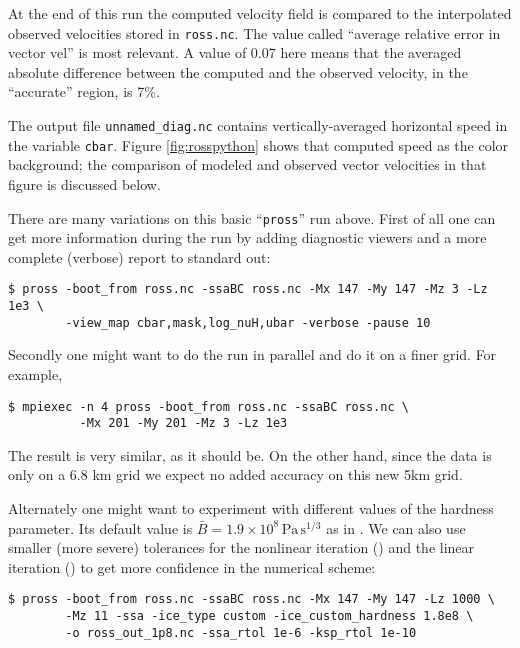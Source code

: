 At the end of this run the computed velocity field is compared to the interpolated observed velocities stored in \texttt{ross.nc}.  The value called ``average relative error in vector vel'' is most relevant.  A value of 0.07 here means that the averaged absolute difference between the computed and the observed velocity, in the ``accurate'' region, is 7\%.

The output file \texttt{unnamed_diag.nc} contains vertically-averaged horizontal speed in the variable \texttt{cbar}.  Figure \ref{fig:rosspython} shows that computed speed as the color background; the comparison of modeled and observed vector velocities in that figure is discussed below.

There are many variations on this basic ``\texttt{pross}'' run above.  First of all one can get more information during the run by adding diagnostic viewers and a more complete (verbose) report to standard out:
\begin{verbatim}
$ pross -boot_from ross.nc -ssaBC ross.nc -Mx 147 -My 147 -Mz 3 -Lz 1e3 \
        -view_map cbar,mask,log_nuH,ubar -verbose -pause 10
\end{verbatim}
Secondly one might want to do the run in parallel and do it on a finer grid.  For example,

\begin{verbatim}
$ mpiexec -n 4 pross -boot_from ross.nc -ssaBC ross.nc \
          -Mx 201 -My 201 -Mz 3 -Lz 1e3
\end{verbatim}
The result is very similar, as it should be.  On the other hand, since the data is only on a 6.8 km grid we expect no added accuracy on this new 5km grid.

Alternately one might want to experiment with different values of the hardness parameter.  Its default value is $\bar B = 1.9 \times 10^8 \, \text{Pa}\, \text{s}^{1/3}$ as in \cite{MacAyealetal}.   We can also use smaller (more severe) tolerances for the nonlinear iteration () and the linear iteration () to get more confidence in the numerical scheme:

\begin{verbatim}
$ pross -boot_from ross.nc -ssaBC ross.nc -Mx 147 -My 147 -Lz 1000 \
        -Mz 11 -ssa -ice_type custom -ice_custom_hardness 1.8e8 \
        -o ross_out_1p8.nc -ssa_rtol 1e-6 -ksp_rtol 1e-10
\end{verbatim}


